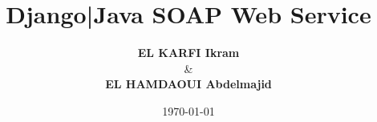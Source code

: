 \documentclass{beamer}
\title[Django|Java SOAP Web Service]{
\textbf{Django|Java SOAP Web Service}
}
\author[Abdelmajid EL HAMDAOUI \& Ikram EL KARFI]{\textbf{\textcolor{deepred}{EL KARFI Ikram}}\\
\& \\
\textbf{\textcolor{deepred}{EL HAMDAOUI Abdelmajid}}}
\institute{FSDM\\[0.5cm]
\textcolor{deepblue}{Sous la supervision de \textbf{Mr. Ahmed Zinedine}}
}%
\date{\today}
\begin{document}
\begin{frame}
\titlepage
\end{frame}






%
%
%
%
%
%


%
\end{document}
